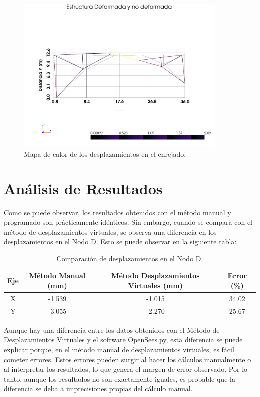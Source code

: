 \documentclass{article}  %
\begin{document}
\begin{figure}[h]
  \centering
  \includegraphics[width=0.9\textwidth]{imagenes/E0_pyvista_heatmap.png}
  \caption{Mapa de calor de los desplazamientos en el enrejado.}
  \label{fig:2}  
\end{figure}


\section{Análisis de Resultados}
Como se puede observar, los resultados obtenidos con el método manual y programado son prácticamente idénticos. Sin embargo, cuando se compara con el método de desplazamientos virtuales, se observa una diferencia en los desplazamientos en el Nodo D. Esto se puede observar en la siguiente tabla:

\begin{table}[h!]
  \centering
  \begin{tabular}{cccc}
  \hline
  \textbf{Eje} & \textbf{Método Manual (mm)} & \textbf{ Método Desplazamientos Virtuales (mm)} & \textbf{Error (\%)} \\
  \hline
  X & -1.539 & -1.015 & 34.02\\
  Y & -3.055 & -2.270 & 25.67\\
  \hline
  \end{tabular}
  \caption{Comparación de desplazamientos en el Nodo D.}
\end{table}

Aunque hay una diferencia entre los datos obtenidos con el Método de Desplazamientos Virtuales y el software OpenSees.py, esta diferencia se puede explicar porque, en el método manual de desplazamientos virtuales, es fácil cometer errores. Estos errores pueden surgir al hacer los cálculos manualmente o al interpretar los resultados, lo que genera el margen de error observado. Por lo tanto, aunque los resultados no son exactamente iguales, es probable que la diferencia se deba a imprecisiones propias del cálculo manual.
\end{document}
